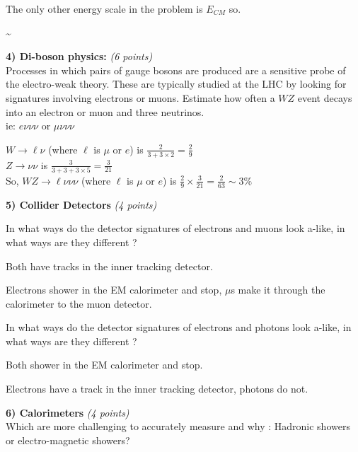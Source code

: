 {The only other energy scale in the problem is $E_{CM}$ so.

\be
\sigma \sim {}
\ee

\ei


\textbf{4) Di-boson physics:  } \hfill \textit{(6 points)}\\
Processes in which pairs of gauge bosons are produced are a sensitive probe of the electro-weak theory. These are typically studied at the LHC by looking for signatures involving electrons or muons.  
Estimate how often a $WZ$ event decays into an electron or muon and three neutrinos.\\ ie: $e\nu\nu\nu$ or $\mu\nu\nu\nu$

\bc
$W \rightarrow \ell\nu$ (where $\ell$ is $\mu$ or $e$) is $\frac{2}{3+3\times 2} = \frac{2}{9}$ \\
$Z \rightarrow \nu\nu$  is $\frac{3}{3+3+3\times 5} = \frac{3}{21}$ \\
So, $WZ \rightarrow \ell\nu\nu\nu$ (where $\ell$ is $\mu$ or $e$) is $\frac{2}{9} \times \frac{3}{21} = \frac{2}{63} \sim 3\%$
\ec

\vspace{0.5in}

\textbf{5) Collider Detectors  } \hfill \textit{(4 points)}\\
\begin{itemize}
\item[a)]{ In what ways do the detector signatures of electrons and muons look a-like, in what ways are they different ?

\bi
\item[-]Both have tracks in the inner tracking detector. 
\item[-]Electrons shower in the EM calorimeter and stop, $\mu$s make it through the calorimeter to the muon detector.
\ei

}
\item[b)]{ In what ways do the detector signatures of electrons and photons look a-like, in what ways are they different ?

\bi
\item[-]Both shower in the EM calorimeter and stop.
\item[-]Electrons have a track in the inner tracking detector, photons do not.
\ei


}
\end{itemize}

\vspace*{0.2in}

\textbf{6) Calorimeters } \hfill \textit{(4 points)}\\
Which are more challenging to accurately measure and why : Hadronic showers or electro-magnetic showers? 

}
